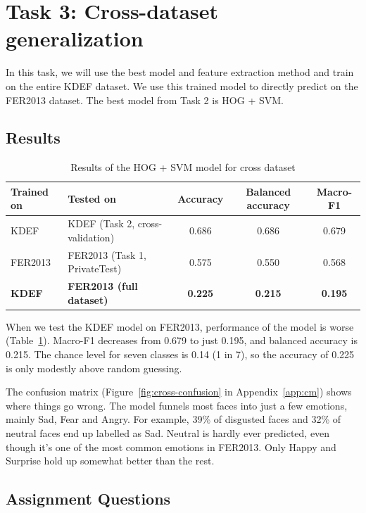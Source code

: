 \section{Task 3: Cross-dataset generalization}
\label{sec:task3}

In this task, we will use the best model and feature extraction method and train on the entire KDEF dataset. We use this trained model to directly predict on the FER2013 dataset. The best model from Task 2 is HOG + SVM.
\subsection{Results}

\begin{table}[h]\centering\small
\begin{tabular}{@{}llccc@{}}\toprule
Trained on & Tested on & Accuracy & Balanced accuracy & Macro-F1 \\\midrule
KDEF & KDEF (Task 2, cross-validation) & 0.686 & 0.686 & 0.679 \\
FER2013 & FER2013 (Task 1, PrivateTest) & 0.575 & 0.550 & 0.568 \\
\textbf{KDEF} & \textbf{FER2013 (full dataset)} & \textbf{0.225} & \textbf{0.215} & \textbf{0.195} \\
\bottomrule\end{tabular}
\caption{Results of the HOG + SVM model for cross dataset}
\label{tab:cross}
\end{table}

When we test the KDEF model on FER2013, performance of the model is worse (Table~\ref{tab:cross}). Macro-F1 decreases from 0.679 to just 0.195, and balanced accuracy is 0.215. The chance level for seven classes is 0.14 (1 in 7), so the accuracy of 0.225 is only modestly above random guessing.

The confusion matrix (Figure~\ref{fig:cross-confusion} in Appendix~\ref{app:cm}) shows where things go wrong. The model funnels most faces into just a few emotions, mainly Sad, Fear and Angry. For example, 39\% of disgusted faces and 32\% of neutral faces end up labelled as Sad. Neutral is hardly ever predicted, even though it's one of the most common emotions in FER2013. Only Happy and Surprise hold up somewhat better than the rest.

\subsection{Assignment Questions}

